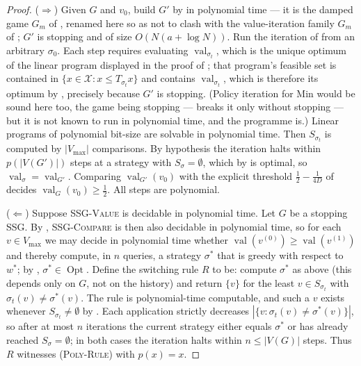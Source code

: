 \documentclass[11pt]{article}
\theoremstyle{plain}
\theoremstyle{definition}
\DeclareMathOperator{\val}{val}
\DeclareMathOperator{\Opt}{Opt}
\newcommand{\Vmax}{V_{\max}}
\begin{document}
\begin{proof}
($\Rightarrow$) Given $G$ and $v_0$, build $G'$ by
 in polynomial time --- it is the damped
game $G_m$ of , renamed here so as not to clash with
the value-iteration family $G_m$ of ; $G'$ is stopping
and of size $O(N(a+\log N))$. Run the iteration of 
from an arbitrary $\sigma_0$. Each step requires evaluating
$\val_{\sigma_t}$, which is the unique optimum of the linear program
displayed in the proof of ; that program's
feasible set is contained in $\{x\in\mathcal{X}:x\le T_{\sigma_t}x\}$ and
contains $\val_{\sigma_t}$, which is therefore its optimum by
, precisely because $G'$ is stopping. (Policy
iteration for Min would be sound here too, the game being stopping ---
 breaks it only without stopping --- but it is not
known to run in polynomial time, and the programme is.) Linear programs
of polynomial bit-size are solvable in polynomial time. Then
$S_{\sigma_t}$ is computed by $|\Vmax|$ comparisons. By hypothesis the
iteration halts within $p(|V(G')|)$ steps at a strategy with
$S_\sigma=\emptyset$, which by  is optimal, so
$\val_{\sigma}=\val_{G'}$. Comparing $\val_{G'}(v_0)$ with the explicit
threshold $\tfrac12-\tfrac1{4D}$ of  decides
$\val_G(v_0)\ge\tfrac12$. All steps are polynomial.

($\Leftarrow$) Suppose \textsc{SSG-Value} is decidable in polynomial time.
Let $G$ be a stopping SSG. By ,
\textsc{SSG-Compare} is then also decidable in polynomial time, so for
each $v\in\Vmax$ we may decide in polynomial time whether
$\val(v^{(0)})\ge\val(v^{(1)})$ and thereby compute, in $n$ queries, a
strategy $\sigma^\ast$ that is greedy with respect to $w^\ast$; by
, $\sigma^\ast\in\Opt$. Define the switching rule
$R$ to be: compute $\sigma^\ast$ as above (this depends only on $G$, not
on the history) and return $\{v\}$ for the least $v\in S_{\sigma_t}$ with
$\sigma_t(v)\ne\sigma^\ast(v)$. The rule is polynomial-time computable,
and such a $v$ exists whenever $S_{\sigma_t}\ne\emptyset$ by
. Each application strictly decreases
$|\{v:\sigma_t(v)\ne\sigma^\ast(v)\}|$, so after at most $n$ iterations
the current strategy either equals $\sigma^\ast$ or has already reached
$S_\sigma=\emptyset$; in both cases the iteration halts within
$n\le|V(G)|$ steps. Thus $R$ witnesses \textsc{(Poly-Rule)} with
$p(x)=x$.
\end{proof}
\end{document}
